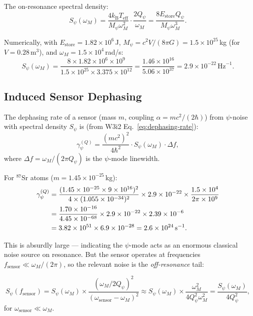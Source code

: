 \documentclass[11pt]{article}
\theoremstyle{definition}
\theoremstyle{remark}
\newcommand{\kB}{k_{\mathrm{B}}}
\newcommand{\Qpsi}{Q_\psi}
\newcommand{\Mpsi}{M_\psi}
\begin{document}
The on-resonance spectral density:
\begin{equation}
S_\psi(\omega_M) = \frac{4 \kB T_{\mathrm{eff}}}{\Mpsi \omega_M^2}
\cdot \frac{2\Qpsi}{\omega_M}
= \frac{8 E_{\mathrm{store}} \Qpsi}{\Mpsi \omega_M^3}.
\end{equation}

Numerically, with $E_{\mathrm{store}} = 1.82 \times 10^6$\,J,
$\Mpsi = c^2 V / (8\pi G) = 1.5 \times 10^{25}$\,kg (for $V = 0.28$\,m$^3$),
and $\omega_M = 1.5 \times 10^4$\,rad/s:
\begin{equation}
S_\psi(\omega_M) = \frac{8 \times 1.82 \times 10^6 \times 10^9}
{1.5 \times 10^{25} \times 3.375 \times 10^{12}}
= \frac{1.46 \times 10^{16}}{5.06 \times 10^{37}}
= 2.9 \times 10^{-22}\,\mathrm{Hz}^{-1}.
\end{equation}

\subsection{Induced Sensor Dephasing}

The dephasing rate of a sensor (mass $m$, coupling $\alpha = mc^2/(2\hbar)$)
from $\psi$-noise with spectral density $S_\psi$ is (from W3i2
Eq.~\eqref{eq:dephasing-rate}):
\begin{equation}
\gamma_{\psi}^{(Q)} = \frac{(mc^2)^2}{4\hbar^2} \cdot S_\psi(\omega_M)
\cdot \Delta f,
\end{equation}
where $\Delta f = \omega_M / (2\pi \Qpsi)$ is the $\psi$-mode linewidth.

For $^{87}$Sr atoms ($m = 1.45 \times 10^{-25}$\,kg):
\begin{align}
\gamma_{\psi}^{(Q)} &= \frac{(1.45 \times 10^{-25} \times 9 \times 10^{16})^2}
{4 \times (1.055 \times 10^{-34})^2} \times 2.9 \times 10^{-22}
\times \frac{1.5 \times 10^4}{2\pi \times 10^9} \notag \\
&= \frac{1.70 \times 10^{-16}}{4.45 \times 10^{-68}}
\times 2.9 \times 10^{-22} \times 2.39 \times 10^{-6} \notag \\
&= 3.82 \times 10^{51} \times 6.9 \times 10^{-28}
= 2.6 \times 10^{24}\,\mathrm{s}^{-1}.
\end{align}

This is absurdly large --- indicating the $\psi$-mode acts as an enormous
classical noise source on resonance. But the sensor operates at
frequencies $f_{\mathrm{sensor}} \ll \omega_M / (2\pi)$, so the relevant
noise is the \emph{off-resonance} tail:

\begin{equation}
S_\psi(f_{\mathrm{sensor}}) = S_\psi(\omega_M) \times
\frac{(\omega_M / 2\Qpsi)^2}{(\omega_{\mathrm{sensor}} - \omega_M)^2}
\approx S_\psi(\omega_M) \times \frac{\omega_M^2}{4\Qpsi^2 \omega_M^2}
= \frac{S_\psi(\omega_M)}{4\Qpsi^2},
\end{equation}
for $\omega_{\mathrm{sensor}} \ll \omega_M$.
\end{document}

